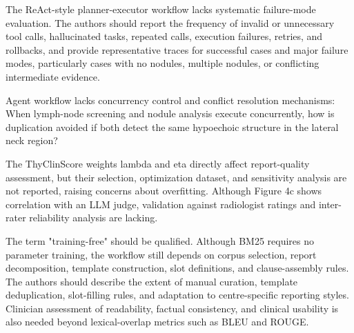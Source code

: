 \label{rev:R2.16}
\begin{reviewercomment}
The ReAct-style planner-executor workflow lacks systematic failure-mode evaluation. The authors should report the frequency of invalid or unnecessary tool calls, hallucinated tasks, repeated calls, execution failures, retries, and rollbacks, and provide representative traces for successful cases and major failure modes, particularly cases with no nodules, multiple nodules, or conflicting intermediate evidence.
\end{reviewercomment}
\begin{authorresponse}

\end{authorresponse}




\label{rev:R2.17}
\begin{reviewercomment}
Agent workflow lacks concurrency control and conflict resolution mechanisms: When lymph-node screening and nodule analysis execute concurrently, how is duplication avoided if both detect the same hypoechoic structure in the lateral neck region?
\end{reviewercomment}
\begin{authorresponse}

\end{authorresponse}

\label{rev:R2.18}
\begin{reviewercomment}
The ThyClinScore weights lambda and eta directly affect report-quality assessment, but their selection, optimization dataset, and sensitivity analysis are not reported, raising concerns about overfitting. Although Figure 4c shows correlation with an LLM judge, validation against radiologist ratings and inter-rater reliability analysis are lacking.
\end{reviewercomment}
\begin{authorresponse}

\end{authorresponse}

\label{rev:R2.19}
\begin{reviewercomment}
The term "training-free" should be qualified. Although BM25 requires no parameter training, the workflow still depends on corpus selection, report decomposition, template construction, slot definitions, and clause-assembly rules. The authors should describe the extent of manual curation, template deduplication, slot-filling rules, and adaptation to centre-specific reporting styles. Clinician assessment of readability, factual consistency, and clinical usability is also needed beyond lexical-overlap metrics such as BLEU and ROUGE.
\end{reviewercomment}
\begin{authorresponse}

\end{authorresponse}

